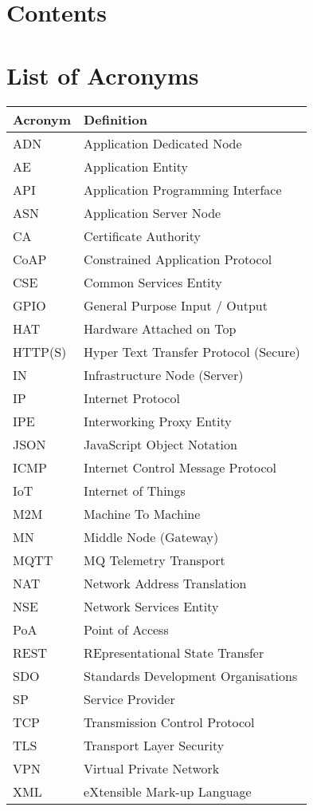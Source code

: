 \documentclass{ecsgdp}
\makeatletter
\renewcommand\tableofcontents{\@starttoc{toc}}
\makeatother
\begin{document}
  \clearpage
  
  \chapter*{Contents}
  \label{sec:contents}
  \tableofcontents
  \clearpage
  
  \chapter*{List of Acronyms}
  \label{sec:acronyms}

  \begin{table}[H]
  \label{acronyms-table}
  \begin{tabularx}{\textwidth}{|l|X|}
    \hline
    \textbf{Acronym} & \textbf{Definition} \\
    \hline

    ADN & Application Dedicated Node \\
    AE & Application Entity \\
    API & Application Programming Interface \\
    ASN & Application Server Node \\
    CA & Certificate Authority \\
    CoAP & Constrained Application Protocol \\
    CSE & Common Services Entity \\
    GPIO & General Purpose Input / Output \\
    HAT & Hardware Attached on Top \\
    HTTP(S) & Hyper Text Transfer Protocol (Secure) \\
    IN & Infrastructure Node (Server) \\
    IP & Internet Protocol \\
    IPE & Interworking Proxy Entity \\
    JSON & JavaScript Object Notation \\
    ICMP & Internet Control Message Protocol\\
    IoT & Internet of Things \\
    M2M & Machine To Machine \\
    MN & Middle Node (Gateway) \\
    MQTT & MQ Telemetry Transport \\
    NAT & Network Address Translation \\
    NSE & Network Services Entity \\
    PoA & Point of Access \\
    REST & REpresentational State Transfer \\
    SDO & Standards Development Organisations \\
    SP & Service Provider \\
    TCP & Transmission Control Protocol \\
    TLS & Transport Layer Security \\
    VPN & Virtual Private Network \\
    XML & eXtensible Mark-up Language \\


\end{tabularx}
\end{table}
\end{document}
